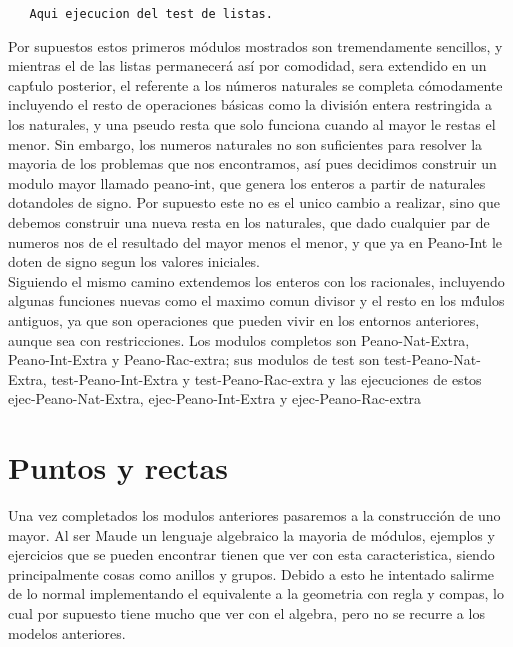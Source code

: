 \documentclass[12pt,a4paper]{book}
\begin{document}
\begin{verbatim}
   Aqui ejecucion del test de listas.
\end{verbatim}

Por supuestos estos primeros m\'odulos mostrados son tremendamente sencillos, y mientras el de las listas permanecer\'a as\'i por comodidad, sera extendido en un cap\'tulo posterior, el referente a los n\'umeros naturales se completa c\'omodamente incluyendo el resto de operaciones b\'asicas como la divisi\'on entera restringida a los naturales, y una pseudo resta que solo funciona cuando al mayor le restas el menor. Sin embargo, los numeros naturales no son suficientes para resolver la mayoria de los problemas que nos encontramos, as\'i pues decidimos construir un modulo mayor llamado peano-int, que genera los enteros a partir de naturales dotandoles de signo. Por supuesto este no es el unico cambio a realizar, sino que debemos construir una nueva resta en los naturales, que dado cualquier par de numeros nos de el resultado del mayor menos el menor, y que ya en Peano-Int le doten de signo segun los valores iniciales. \\

Siguiendo el mismo camino extendemos los enteros con los racionales, incluyendo algunas funciones nuevas como el maximo comun divisor y el resto en los m\'dulos antiguos, ya que son operaciones que pueden vivir en los entornos anteriores, aunque sea con restricciones. Los modulos completos son Peano-Nat-Extra, Peano-Int-Extra y Peano-Rac-extra; sus modulos de test son test-Peano-Nat-Extra, test-Peano-Int-Extra y test-Peano-Rac-extra y las ejecuciones de estos ejec-Peano-Nat-Extra, ejec-Peano-Int-Extra y ejec-Peano-Rac-extra \par

\chapter{Puntos y rectas}\label{cap.2}

Una vez completados los modulos anteriores pasaremos a la construcci\'on de uno mayor. Al ser Maude un lenguaje algebraico la mayoria de m\'odulos, ejemplos y ejercicios que se pueden encontrar tienen que ver con esta caracteristica, siendo principalmente cosas como anillos y grupos. Debido a esto he intentado salirme de lo normal implementando el equivalente a la geometria con regla y compas, lo cual por supuesto tiene mucho que ver con el algebra, pero no se recurre a los modelos anteriores. \\
\end{document}
